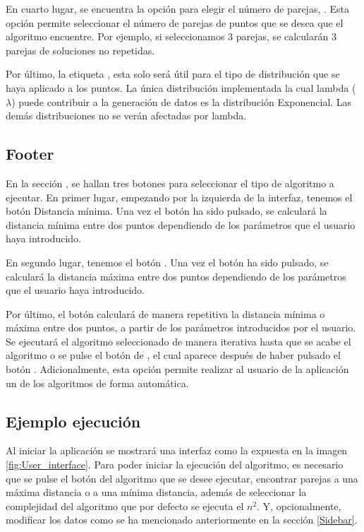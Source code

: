 En cuarto lugar, se encuentra la opción para elegir el número de parejas, . Esta opción permite seleccionar el número de parejas de puntos que se desea que el algoritmo encuentre. Por ejemplo, si seleccionamos 3 parejas, se calcularán 3 parejas de soluciones no repetidas. \bigskip

Por último, la etiqueta , esta solo será útil para el tipo de distribución que se haya aplicado a los puntos. La única distribución implementada la cual lambda ($\lambda$) puede contribuir a la generación de datos es la distribución Exponencial. Las demás distribuciones no se verán afectadas por lambda.

\subsection{Footer}\label{Footer}

En la sección , se hallan tres botones para seleccionar el tipo de algoritmo a ejecutar.
En primer lugar, empezando por la izquierda de la interfaz, tenemos el botón Distancia mínima. Una vez el botón ha sido pulsado, se calculará la distancia mínima entre dos puntos dependiendo de los parámetros que el usuario haya introducido.\bigskip

En segundo lugar, tenemos el botón . Una vez el botón ha sido pulsado, se calculará la distancia máxima entre dos puntos dependiendo de los parámetros que el usuario haya introducido.\bigskip 

Por último, el botón  calculará de manera repetitiva la distancia mínima o máxima entre dos puntos, a partir de los parámetros introducidos por el usuario. Se ejecutará el algoritmo seleccionado de manera iterativa hasta que se acabe el algoritmo o se pulse el botón de , el cual aparece después de haber pulsado el botón . Adicionalmente, esta opción permite realizar al usuario de la aplicación un  de los algoritmos de forma automática.

\subsection{Ejemplo ejecución}

Al iniciar la aplicación se mostrará una interfaz como la expuesta en la imagen \ref{fig:User_interface}. Para poder iniciar la ejecución del algoritmo, es necesario que se pulse el botón del algoritmo que se desee ejecutar, encontrar parejas a una máxima distancia o a una mínima distancia, además de seleccionar la complejidad del algoritmo que por defecto se ejecuta el $n^2$. Y, opcionalmente, modificar los datos como se ha mencionado anteriormente en la sección \ref{Sidebar}. 

